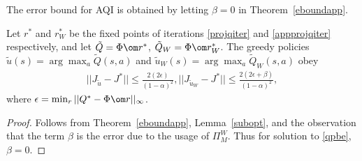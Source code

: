 The error bound for AQI is obtained by letting $\beta=0$ in Theorem~\ref{eboundapp}.
\begin{corollary}\label{polperf}
Let $r^*$ and $r^*_W$ be the fixed points of iterations \eqref{projqiter} and \eqref{appprojqiter} respectively, and let $\tilde{Q}=\Phi \om r^*$, $\tilde{Q}_W=\Phi \om r^*_W$. The greedy policies $\tilde{u}(s)=\arg\max_a \tilde{Q}(s,a)$ and $\tilde{u}_W(s)=\arg\max_a \tilde{Q}_W(s,a)$ obey
\begin{align}
||J_{\tilde{u}}-J^*||\leq \frac{2(2\epsilon)}{(1-\alpha)^2}, ||J_{\tilde{u}_W}-J^*||\leq \frac{2(2\epsilon+\beta)}{(1-\alpha)^2},
\end{align}
where $\epsilon=\min_r||Q^*-\Phi\om r||_\infty$.
\end{corollary}
\begin{proof}
Follows from Theorem~\ref{eboundapp}, Lemma~\ref{subopt}, and the observation that the term $\beta$ is the error due to the usage of $\Pi^W_M$. Thus for solution to \eqref{qpbe}, $\beta=0$.
\end{proof}
